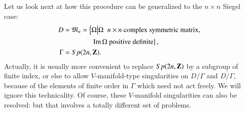 \section{}\label{art8-sec2}
Let us look next at how this procedure can be generalized to the $n \times n$ Siegel case:
\begin{align*}
D & = \mathfrak{M}_n = \left\{ \Omega \big| \Omega \;\; n \times n \text{ complex symmetric matrix,} \right.\\
& \qquad \qquad \left. \operatorname{Im} \Omega \text{ positive definite} \right\},\\
\Gamma & = Sp (2n, \mathbf{Z}).
\end{align*}
Actually, it is usually more convenient to replace $Sp (2n,\mathbf{Z})$ by a subgroup of finite index, or else to allow $V$-manifold-type singularities on $D/\Gamma$ and $\overline{D/\Gamma}$, because of the elements of finite order in $\Gamma$ which need not act freely. We will ignore this technicality. Of course, these $V$-manifold singularities can also be resolved: but that involves a totally different set of problems.

